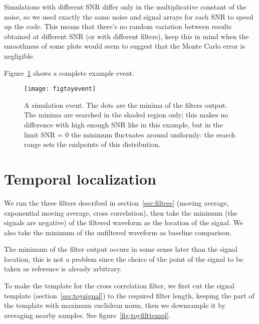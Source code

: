 
Simulations with different SNR differ only in the multiplicative constant of
the noise, so we used exactly the same noise and signal arrays for each SNR to
speed up the code. This means that there's no random variation between results
obtained at different SNR (or with different filters), keep this in mind when
the smoothness of some plots would seem to suggest that the Monte Carlo error
is negligible.

Figure~\ref{fig:toyevent} shows a complete example event.

\begin{figure}
    \hspace{-0.15\textwidth}
    \texttt{[image: figtoyevent]}
    
    \caption{A simulation event. The dots are the minima of the filters output.
    The minima are searched in the shaded region only; this makes no difference
    with high enough SNR like in this example, but in the limit SNR = 0 the
    minimum fluctuates around uniformly: the search range sets the endpoints of
    this distribution.}
    
    \label{fig:toyevent}
\end{figure}

\section{Temporal localization}

We run the three filters described in section~\ref{sec:filters} (moving
average, exponential moving average, cross correlation), then take the minimum
(the signals are negative) of the filtered waveform as the location of the
signal. We also take the minimum of the unfiltered waveform as baseline
comparison.

The minimum of the filter output occurs in some sense later than the signal
location, this is not a problem since the choice of the point of the signal to
be taken as reference is already arbitrary.

To make the template for the cross correlation filter, we first cut the signal
template (section~\ref{sec:toysignal}) to the required filter length, keeping
the part of the template with maximum euclidean norm, then we downsample it by
averaging nearby samples. See figure~\ref{fig:toyfilttempl}.

